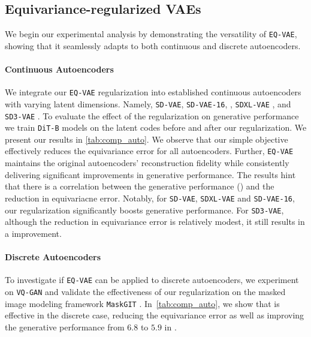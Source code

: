 

\subsection{Equivariance-regularized VAEs}
We begin our experimental analysis by demonstrating the versatility of \texttt{EQ-VAE}, showing that it seamlessly adapts to both continuous 
and discrete autoencoders.


\paragraph{Continuous Autoencoders}
We integrate our \texttt{EQ-VAE} regularization into established continuous autoencoders with varying latent dimensions. Namely,
\texttt{SD-VAE}, \texttt{SD-VAE-16}, \cite{rombach2022high}, \texttt{SDXL-VAE} \cite{podell2024sdxl}, and \texttt{SD3-VAE} \cite{esser2024sd3}. 
To evaluate the effect of the regularization on generative performance we train 
\texttt{DiT-B} models on the latent codes
before and after our regularization. 
We present our results in \autoref{tab:comp_auto}. 
We observe that our simple objective effectively reduces the equivariance error for all autoencoders. 
Further, \texttt{EQ-VAE} maintains the original autoencoders’ reconstruction fidelity while consistently delivering significant improvements in generative performance. 
The results hint that there is
a correlation between the generative performance () and the reduction in equivariacne error. Notably, for \texttt{SD-VAE}, \texttt{SDXL-VAE} and \texttt{SD-VAE-16}, our regularization significantly boosts generative performance. For \texttt{SD3-VAE}, although the reduction in equivariance error is relatively modest, it still results in a  improvement.








\paragraph{Discrete Autoencoders}
To investigate if \texttt{EQ-VAE} can be applied to discrete autoencoders, we experiment on \texttt{VQ-GAN} \cite{esser2021taming} and validate the effectiveness of our regularization on the masked image modeling framework \texttt{MaskGIT} \cite{chang2022maskgit}. In~\autoref{tab:comp_auto}, we show that \our is effective in the discrete case, reducing the equivariance error as well as improving the generative performance from $6.8$ to $5.9$ in .



